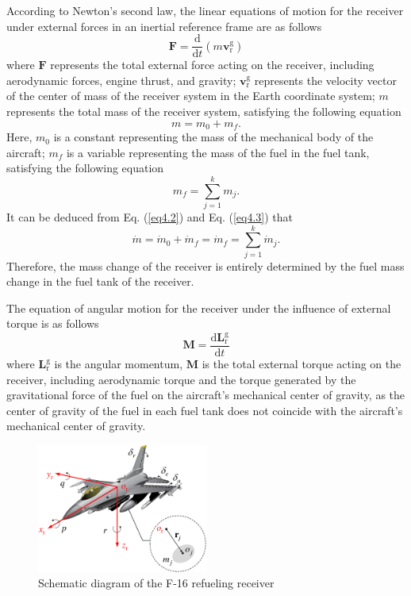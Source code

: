 According to Newton's second law, the linear equations of motion for the receiver under external forces in an inertial reference frame are as follows 
\begin{equation}\label{eq4.1}
\mathbf{F} = \frac{\text{d}}{{\text{d}t}}\left( {m\mathbf{v}\mathrm{_{r}^{g}}} \right)
\end{equation}
where $\mathbf{F}$ represents the total external force acting on the receiver, including aerodynamic forces, engine thrust, and gravity; $\mathbf{v}\mathrm{_r^g}$ represents the velocity vector of the center of mass of the receiver system in the Earth coordinate system; $m$ represents the total mass of the receiver system, satisfying the following equation 
\begin{equation}\label{eq4.2}
m = {m_0} + {m_f} .
\end{equation}
Here, ${m_0}$ is a constant representing the mass of the mechanical body of the aircraft; ${m_f}$ is a variable representing the mass of the fuel in the fuel tank, satisfying the following equation 
\begin{equation}\label{eq4.3}
{m_f} = \sum\limits_{j = 1}^k {{m_j}} .
\end{equation}
It can be deduced from Eq. (\ref{eq4.2}) and Eq. (\ref{eq4.3}) that
\begin{equation}\label{eq4.4}
\dot m = {\dot m_0} + {\dot m_f} = {\dot m_f} = \sum\limits_{j = 1}^k {{{\dot m}_j}} .
\end{equation}
Therefore, the mass change of the receiver is entirely determined by the fuel mass change in the fuel tank of the receiver.

The equation of angular motion for the receiver under the influence of external torque is as follows
\begin{equation}\label{eq4.5}
\mathbf{M} = \frac{\mathrm{d}\mathbf{L}\mathrm{_r^g}}{\mathrm{d}t}
\end{equation}
where $\mathbf{L}\mathrm{_r^g}$ is the angular momentum, $\mathbf{M}$ is the total external torque acting on the receiver, including aerodynamic torque and the torque generated by the gravitational force of the fuel on the aircraft’s mechanical center of gravity, as the center of gravity of the fuel in each fuel tank does not coincide with the aircraft’s mechanical center of gravity.
\begin{figure}[th]
	\centering
	\includegraphics[width=0.5\textwidth]{Figures/Figs_Ch3/fig1.pdf}
	\caption{Schematic diagram of the F-16 refueling receiver}\label{fig4.1}
\end{figure}

